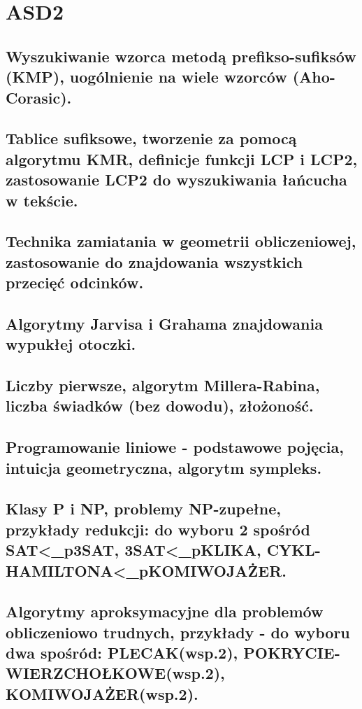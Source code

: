\chapter{ASD2}

\section{Wyszukiwanie wzorca metodą prefikso-sufiksów (KMP), uogólnienie na wiele wzorców (Aho-Corasic).}
% 

\section{Tablice sufiksowe, tworzenie za pomocą algorytmu KMR, definicje funkcji LCP i LCP2, zastosowanie LCP2 do wyszukiwania łańcucha w tekście.}
% 

\section{Technika zamiatania w geometrii obliczeniowej, zastosowanie do znajdowania wszystkich przecięć odcinków.}
% 

\section{Algorytmy Jarvisa i Grahama znajdowania wypukłej otoczki.}
% 

\section{Liczby pierwsze, algorytm Millera-Rabina, liczba świadków (bez dowodu), złożoność.}
% 

\section{Programowanie liniowe - podstawowe pojęcia, intuicja geometryczna, algorytm sympleks.}
% 

\section{Klasy P i NP, problemy NP-zupełne, przykłady redukcji: do wyboru 2 spośród SAT<_p3SAT, 3SAT<_pKLIKA, CYKL-HAMILTONA<_pKOMIWOJAŻER.}
% 

\section{Algorytmy aproksymacyjne dla problemów obliczeniowo trudnych, przykłady - do wyboru dwa spośród: PLECAK(wsp.2), POKRYCIE-WIERZCHOŁKOWE(wsp.2), KOMIWOJAŻER(wsp.2).}
